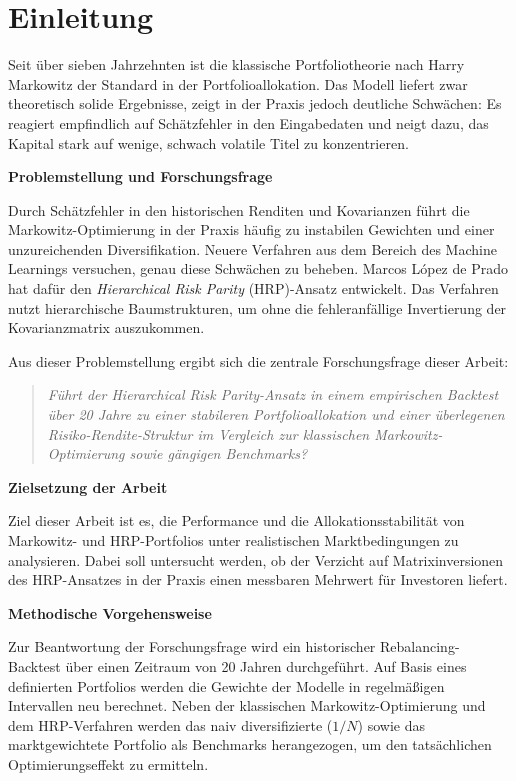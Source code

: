 \documentclass[parskip=half]{scrartcl}
\begin{document}
	\clearpage
	
	\setcounter{page}{1}
	

	\section{Einleitung}
	
	Seit über sieben Jahrzehnten ist die klassische Portfoliotheorie nach Harry Markowitz der Standard in der Portfolioallokation. Das Modell liefert zwar theoretisch solide Ergebnisse, zeigt in der Praxis jedoch deutliche Schwächen: Es reagiert empfindlich auf Schätzfehler in den Eingabedaten und neigt dazu, das Kapital stark auf wenige, schwach volatile Titel zu konzentrieren.
	
	\textbf{Problemstellung und Forschungsfrage}
	
	Durch Schätzfehler in den historischen Renditen und Kovarianzen führt die Markowitz-Optimierung in der Praxis häufig zu instabilen Gewichten und einer unzureichenden Diversifikation. Neuere Verfahren aus dem Bereich des Machine Learnings versuchen, genau diese Schwächen zu beheben. Marcos López de Prado hat dafür den \textit{Hierarchical Risk Parity} (HRP)-Ansatz entwickelt. Das Verfahren nutzt hierarchische Baumstrukturen, um ohne die fehleranfällige Invertierung der Kovarianzmatrix auszukommen.
	
	Aus dieser Problemstellung ergibt sich die zentrale Forschungsfrage dieser Arbeit:
	\begin{quote}
		\textit{Führt der Hierarchical Risk Parity-Ansatz in einem empirischen Backtest über 20 Jahre zu einer stabileren Portfolioallokation und einer überlegenen Risiko-Rendite-Struktur im Vergleich zur klassischen Markowitz-Optimierung sowie gängigen Benchmarks?}
	\end{quote}
	
	\textbf{Zielsetzung der Arbeit}
	
	Ziel dieser Arbeit ist es, die Performance und die Allokationsstabilität von Markowitz- und HRP-Portfolios unter realistischen Marktbedingungen zu analysieren. Dabei soll untersucht werden, ob der Verzicht auf Matrixinversionen des HRP-Ansatzes in der Praxis einen messbaren Mehrwert für Investoren liefert.
	
	\textbf{Methodische Vorgehensweise}
	
	Zur Beantwortung der Forschungsfrage wird ein historischer Rebalancing-Backtest über einen Zeitraum von 20 Jahren durchgeführt. Auf Basis eines definierten Portfolios werden die Gewichte der Modelle in regelmäßigen Intervallen neu berechnet. Neben der klassischen Markowitz-Optimierung und dem HRP-Verfahren werden das naiv diversifizierte ($1/N$) sowie das marktgewichtete Portfolio als Benchmarks herangezogen, um den tatsächlichen Optimierungseffekt zu ermitteln.
	
\end{document}
